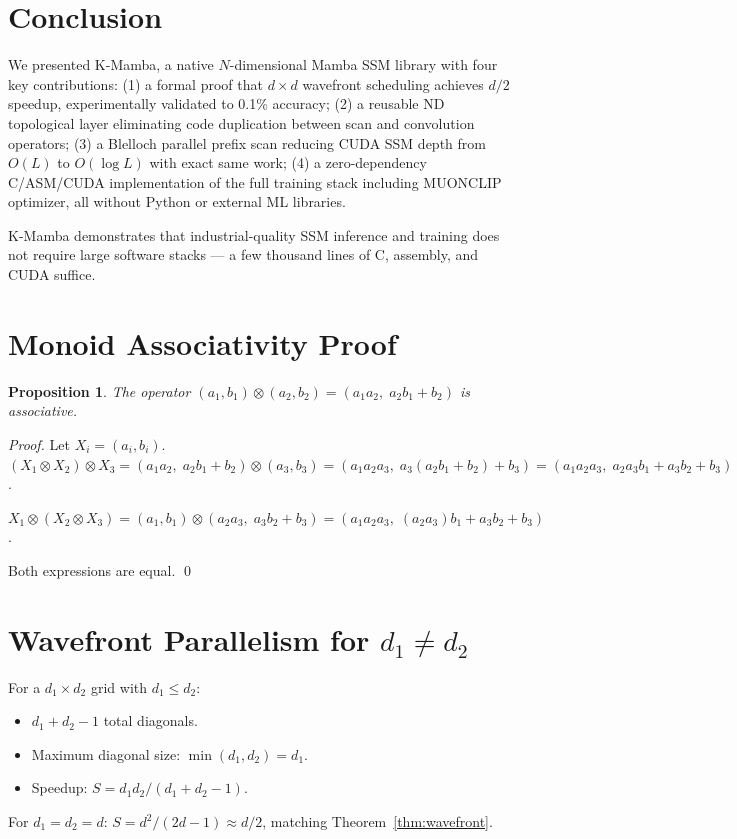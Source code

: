\documentclass[10pt,onecolumn]{article}
\newtheorem{proposition}{Proposition}
\begin{document}
\section{Conclusion}

We presented K-Mamba, a native $N$-dimensional Mamba SSM library
with four key contributions: (1) a formal proof that $d \times d$
wavefront scheduling achieves $d/2$ speedup, experimentally validated
to 0.1\% accuracy; (2) a reusable ND topological layer eliminating code
duplication between scan and convolution operators; (3) a Blelloch parallel
prefix scan reducing CUDA SSM depth from $O(L)$ to $O(\log L)$ with exact
same work; (4) a zero-dependency C/ASM/CUDA implementation of the full
training stack including MUONCLIP optimizer, all without Python or external
ML libraries.

K-Mamba demonstrates that industrial-quality SSM inference and training
does not require large software stacks —
a few thousand lines of C, assembly, and CUDA suffice.

\appendix
\section{Monoid Associativity Proof}
\label{app:monoid}

\begin{proposition}
The operator $(a_1,b_1) \otimes (a_2,b_2) = (a_1 a_2,\; a_2 b_1 + b_2)$
is associative.
\end{proposition}

\begin{proof}
Let $X_i = (a_i, b_i)$.
$(X_1 \otimes X_2) \otimes X_3
= (a_1 a_2,\; a_2 b_1 + b_2) \otimes (a_3, b_3)
= (a_1 a_2 a_3,\; a_3(a_2 b_1 + b_2) + b_3)
= (a_1 a_2 a_3,\; a_2 a_3 b_1 + a_3 b_2 + b_3)$.

$X_1 \otimes (X_2 \otimes X_3)
= (a_1, b_1) \otimes (a_2 a_3,\; a_3 b_2 + b_3)
= (a_1 a_2 a_3,\; (a_2 a_3) b_1 + a_3 b_2 + b_3)$.

Both expressions are equal. \qed
\end{proof}

\section{Wavefront Parallelism for $d_1 \neq d_2$}
\label{app:wavefront_rect}

For a $d_1 \times d_2$ grid with $d_1 \leq d_2$:
\begin{itemize}
  \item $d_1 + d_2 - 1$ total diagonals.
  \item Maximum diagonal size: $\min(d_1, d_2) = d_1$.
  \item Speedup: $S = d_1 d_2 / (d_1 + d_2 - 1)$.
\end{itemize}
For $d_1 = d_2 = d$: $S = d^2/(2d-1) \approx d/2$, matching Theorem~\ref{thm:wavefront}.



\end{document}

